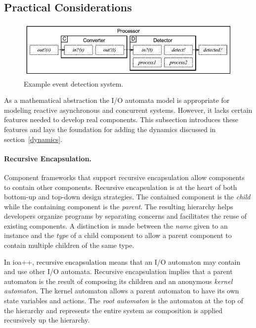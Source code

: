 \subsection{Practical Considerations\label{practical}}

\begin{figure}
\center
\includegraphics[width=\textwidth]{system_model}
\caption{Example event detection system.}
\label{sys_model}
\end{figure}

As a mathematical abstraction the I/O automata model is appropriate for modeling reactive asynchronous and concurrent systems.
However, it lacks certain features needed to develop real components.
This subsection introduces these features and lays the foundation for adding the dynamics discussed in section~\ref{dynamics}.

\paragraph{Recursive Encapsulation.}
Component frameworks that support recursive encapsulation allow components to contain other components.
Recursive encapsulation is at the heart of both bottom-up and top-down design strategies.
The contained component is the \emph{child} while the containing component is the \emph{parent}.
The resulting hierarchy helps developers organize programs by separating concerns and facilitates the reuse of existing components.
A distinction is made between the \emph{name} given to an instance and the \emph{type} of a child component to allow a parent component to contain multiple children of the same type.

In ioa++, recursive encapsulation means that an I/O automaton may contain and use other I/O automata.
Recursive encapsulation implies that a parent automaton is the result of composing its children and an anonymous \emph{kernel automaton}.
The kernel automaton allows a parent automaton to have its own state variables and actions.
The \emph{root automaton} is the automaton at the top of the hierarchy and represents the entire system as composition is applied recursively up the hierarchy.

